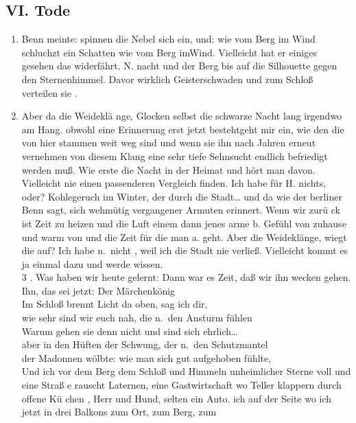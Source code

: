 \documentclass[
]{article}
\author{}
\date{\vspace{-2.5em}}
\providecommand{\tightlist}{%
  \setlength{\itemsep}{0pt}\setlength{\parskip}{0pt}}
\begin{document}
\subsection{VI. Tode}\label{vi.-tode}

\begin{enumerate}
\def\labelenumi{\arabic{enumi}.}
\tightlist
\item
  Benn meinte: spinnen die Nebel sich ein, und: wie vom Berg im Wind
  schluchzt ein Schatten wie vom Berg imWind. Vielleicht hat er einiges
  gesehen das widerfährt. N. nacht und der Berg bis auf die Silhouette
  gegen den Sternenhimmel. Davor wirklich Geisterschwaden und zum Schloß
  verteilen sie .\\
\item
  Aber da die Weideklä nge, Glocken selbst die schwarze Nacht lang
  irgendwo am Hang. obwohl eine Erinnerung erst jetzt bestehtgeht mir
  ein, wie den die von hier stammen weit weg sind und wenn sie ihn nach
  Jahren erneut vernehmen von diesem Klang eine sehr tiefe Sehnsucht
  endlich befriedigt werden muß. Wie erste die Nacht in der Heimat und
  hört man davon. Vielleicht nie einen passenderen Vergleich finden. Ich
  habe für H. nichts, oder? Kohlegeruch im Winter, der durch die
  Stadt\ldots{} und da wie der berliner Benn sagt, sich wehmütig
  vergangener Armuten erinnert. Wenn wir zurü ck ist Zeit zu heizen und
  die Luft einem dann jenes arme b. Gefühl von zuhause und warm von und
  die Zeit für die man a. geht. Aber die Weideklänge, wiegt die auf? Ich
  habe n.~nicht , weil ich die Stadt nie verließ. Vielleicht kommt es ja
  einmal dazu und werde wissen.\\
  3 . Was haben wir heute gelernt: Dann war es Zeit, daß wir ihn wecken
  gehen. Ihn, das sei jetzt: Der Märchenkönig\\
  Im Schloß brennt Licht da oben, sag ich dir,\\
  wie sehr sind wir euch nah, die n.~den Ansturm fühlen\\
  Warum gehen sie denn nicht und sind sich ehrlich\ldots{}\\
  aber in den Hüften der Schwung, der n.~den Schutzmantel\\
  der Madonnen wölbte: wie man sich gut aufgehoben fühlte,\\
  Und ich vor dem Berg dem Schloß und Himmeln unheimlicher Sterne voll
  und eine Straß e rauscht Laternen, eine Gastwirtschaft wo Teller
  klappern durch offene Kü chen , Herr und Hund, selten ein Auto. ich
  auf der Seite wo ich jetzt in drei Balkons zum Ort, zum Berg, zum

\end{enumerate}
\end{document}
